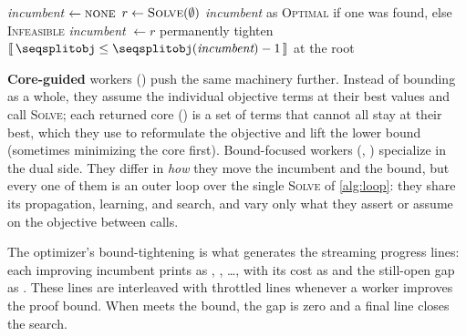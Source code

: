 \begin{algorithm}[htbp]
\caption{Linear scan: \textsc{MinimizeByLinearScan} tightens a monotone bound}
\label{alg:linscan}
\begin{algorithmic}[1]
  \State \textit{incumbent} $\gets \textsc{none}$
  \Loop
    \State $r \gets \Call{Solve}{\emptyset}$ 
      \State \Return \textit{incumbent} as \textsc{Optimal} if one was found, else \textsc{Infeasible}
    \EndIf
    \State \textit{incumbent} $\gets r$ 
    \State permanently tighten $\bl{\, \code{obj} \le \code{obj}(\textit{incumbent}) - 1 \,}$ at the root
  \EndLoop
\EndProcedure
\end{algorithmic}
\end{algorithm}

\textbf{Core-guided} workers
() push the same machinery
further. Instead of bounding
 as a whole, they assume the individual objective terms at their best
values and call \textsc{Solve}; each returned core
() is a set of terms that cannot
all stay at their best, which they use to reformulate the objective and lift the
lower bound (sometimes minimizing the core first). Bound-focused workers
(, ) specialize in the dual
side. They differ in \emph{how} they move the incumbent and the bound, but every
one of them is an outer loop over the single \textsc{Solve} of
\cref{alg:loop}: they share its propagation, learning, and search, and
vary only what they assert or assume on the objective between calls.

\begin{platypuslog}[htb]
The optimizer's bound-tightening is what generates the streaming progress lines: each
improving incumbent prints as , , \ldots, with its cost as
 and the still-open gap as . These lines are
interleaved with throttled  lines whenever a worker improves the
proof bound. When  meets the bound, the gap is zero and a final
 line closes the search.
\end{platypuslog}
